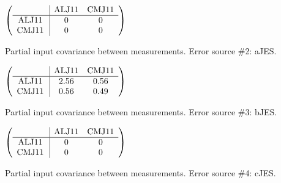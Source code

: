 \begin{table}[H]
\scriptsize
\begin{center}
\renewcommand{\arraystretch}{1.1}
\begin{math}\left(\begin{array}{c|cc}
 & \mathrm{ALJ11} & 
\mathrm{CMJ11} \\
\hline
\mathrm{ALJ11} \hspace*{2pt} &  0 &  0 \\
\mathrm{CMJ11} \hspace*{2pt} &  0 &  0 \\
\end{array}\right)\end{math}
\caption{Partial input covariance between measurements. Error source \#2: aJES.}
\renewcommand{\arraystretch}{1}
\end{center}
\end{table}
\begin{table}[H]
\scriptsize
\begin{center}
\renewcommand{\arraystretch}{1.1}
\begin{math}\left(\begin{array}{c|cc}
 & \mathrm{ALJ11} & 
\mathrm{CMJ11} \\
\hline
\mathrm{ALJ11} \hspace*{2pt} &       2.56 &       0.56 \\
\mathrm{CMJ11} \hspace*{2pt} &       0.56 &       0.49 \\
\end{array}\right)\end{math}
\caption{Partial input covariance between measurements. Error source \#3: bJES.}
\renewcommand{\arraystretch}{1}
\end{center}
\end{table}
\begin{table}[H]
\scriptsize
\begin{center}
\renewcommand{\arraystretch}{1.1}
\begin{math}\left(\begin{array}{c|cc}
 & \mathrm{ALJ11} & 
\mathrm{CMJ11} \\
\hline
\mathrm{ALJ11} \hspace*{2pt} &  0 &  0 \\
\mathrm{CMJ11} \hspace*{2pt} &  0 &  0 \\
\end{array}\right)\end{math}
\caption{Partial input covariance between measurements. Error source \#4: cJES.}
\renewcommand{\arraystretch}{1}
\end{center}
\end{table}
